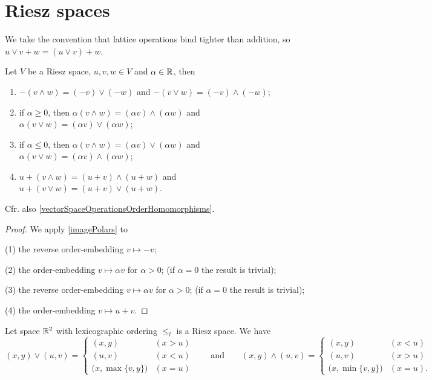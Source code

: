 \section{Riesz spaces}

We take the convention that lattice operations bind tighter than addition, so $u\vee v + w = (u\vee v) + w$.

\begin{lemma} \label{lemmaRieszSpaces}
Let $V$ be a Riesz space, $u,v,w\in V$ and $\alpha\in \mathbb{R}$, then
\begin{enumerate}
\item $-(v \wedge w) = (-v)\vee (-w)$ and $-(v \vee w) = (-v)\wedge (-w)$;
\item if $\alpha \geq 0$, then $\alpha(v \wedge w) = (\alpha v)\wedge (\alpha w)$ and $\alpha(v \vee w) = (\alpha v)\vee (\alpha w)$;
\item if $\alpha \leq 0$, then $\alpha(v \wedge w) = (\alpha v)\vee (\alpha w)$ and $\alpha(v \vee w) = (\alpha v)\wedge (\alpha w)$;
\item $u+(v \wedge w) = (u+v)\wedge (u+w)$ and $u+(v \vee w) = (u+v)\vee (u+w)$.
\end{enumerate}
\end{lemma}
Cfr. also \ref{vectorSpaceOperationsOrderHomomorphisms}.
\begin{proof}
We apply \ref{imagePolars} to

(1) the reverse order-embedding $v\mapsto -v$;

(2) the order-embedding $v\mapsto \alpha v$ for $\alpha > 0$; (if $\alpha = 0$ the result is trivial);

(3) the reverse order-embedding $v\mapsto \alpha v$ for $\alpha > 0$; (if $\alpha = 0$ the result is trivial);

(4) the order-embedding $v\mapsto u+v$.
\end{proof}

\begin{example}
Let space $\mathbb{R}^2$ with lexicographic ordering $\leq_l$ is a Riesz space. We have
\[ (x,y)\vee (u,v) = \begin{cases}
(x,y) & (x>u) \\ (u,v) & (x<u) \\ \big(x, \max\{v,y\}\big) & (x = u)
\end{cases} \qquad\text{and}\qquad (x,y)\wedge (u,v) = \begin{cases}
(x,y) & (x<u) \\ (u,v) & (x>u) \\ \big(x, \min\{v,y\}\big) & (x = u).
\end{cases} \]
\end{example}

